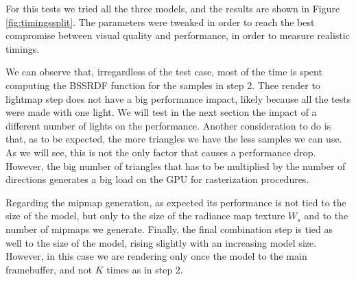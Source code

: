 For this tests we tried all the three models, and the results are shown in Figure \ref{fig:timingssplit}. The parameters were tweaked in order to reach the best compromise between visual quality and performance, in order to measure realistic timings. 

We can observe that, irregardless of the test case, most of the time is spent computing the BSSRDF function for the samples in step 2. Thee render to lightmap step does not have a big performance impact, likely because all the tests were made with one light. We will test in the next section the impact of a different number of lights on the performance.  Another consideration to do is that, as to be expected, the more triangles we have the less samples we can use. As we will see, this is not the only factor that causes a performance drop. However, the big number of triangles that has to be multiplied by the number of directions generates a big load on the GPU for rasterization procedures. 

Regarding the mipmap generation, as expected its performance is not tied to the size of the model, but only to the size of the radiance map texture $W_s$ and to the number of mipmaps we generate. Finally, the final combination step is tied as well to the size of the model, rising slightly with an increasing model size. However, in this case we are rendering only once the model to the main framebuffer, and not $K$ times as in step 2.

